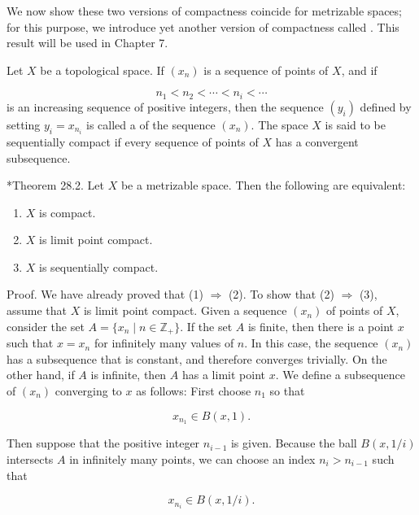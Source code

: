We now show these two versions of compactness coincide for metrizable spaces; for this purpose, we introduce yet another version of compactness called . This result will be used in Chapter 7.

\begin{definition}
 Let \(X\) be a topological space. If \(( x_{n})\) is a sequence of points of \(X\), and if

\[
n_{1} < n_{2} < \cdots < n_{i} < \cdots
\]
is an increasing sequence of positive integers, then the sequence \(( y_{i})\) defined by setting \(y_{i} = x_{n_{i}}\) is called a  of the sequence \(( x_{n})\). The space \(X\) is said to be sequentially compact if every sequence of points of \(X\) has a convergent subsequence.
\end{definition}

*Theorem 28.2. Let \(X\) be a metrizable space. Then the following are equivalent:

\begin{enumerate}[itemsep=0.2em, parsep=0pt, topsep=0pt, partopsep=0pt, leftmargin=*, label=(\arabic*), align=left]
\item \(X\) is compact.
\item \(X\) is limit point compact.
\item \(X\) is sequentially compact.
\end{enumerate}

Proof. We have already proved that (1) \(\Rightarrow\) (2). To show that (2) \(\Rightarrow\) (3), assume that \(X\) is limit point compact. Given a sequence \(( x_{n})\) of points of \(X\), consider the set \(A = \{ {x_{n} \mid n \in {\mathbb{Z}}_{ + }}\}\). If the set \(A\) is finite, then there is a point \(x\) such that \(x = x_{n}\) for infinitely many values of \(n\). In this case, the sequence \(( x_{n})\) has a subsequence that is constant, and therefore converges trivially. On the other hand, if \(A\) is infinite, then \(A\) has a limit point \(x\). We define a subsequence of \(( x_{n})\) converging to \(x\) as follows: First choose \(n_{1}\) so that

\[
x_{n_{1}} \in B( {x,1}) \text{.}
\]

Then suppose that the positive integer \(n_{i - 1}\) is given. Because the ball \(B( {x,1/i})\) intersects \(A\) in infinitely many points, we can choose an index \(n_{i} > n_{i - 1}\) such that

\[
x_{n_{i}} \in B( {x,1/i}) \text{.}
\]


